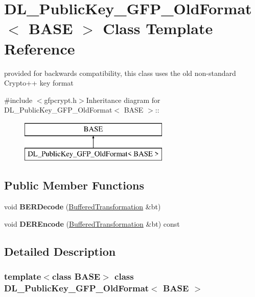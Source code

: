 \hypertarget{class_d_l___public_key___g_f_p___old_format}{
\section{DL\_\-PublicKey\_\-GFP\_\-OldFormat$<$ BASE $>$ Class Template Reference}
\label{class_d_l___public_key___g_f_p___old_format}
}


provided for backwards compatibility, this class uses the old non-\/standard Crypto++ key format  


{\ttfamily \#include $<$gfpcrypt.h$>$}Inheritance diagram for DL\_\-PublicKey\_\-GFP\_\-OldFormat$<$ BASE $>$::\begin{figure}[H]
\begin{center}
\leavevmode
\includegraphics[height=2cm]{class_d_l___public_key___g_f_p___old_format}
\end{center}
\end{figure}
\subsection*{Public Member Functions}
\begin{DoxyCompactItemize}
\item 
\hypertarget{class_d_l___public_key___g_f_p___old_format_a5c686ed241fe4eb62651fc3a02adf5ea}{
void {\bfseries BERDecode} (\hyperlink{class_buffered_transformation}{BufferedTransformation} \&bt)}
\label{class_d_l___public_key___g_f_p___old_format_a5c686ed241fe4eb62651fc3a02adf5ea}

\item 
\hypertarget{class_d_l___public_key___g_f_p___old_format_adcb4024350af6eb978de67a745366cf0}{
void {\bfseries DEREncode} (\hyperlink{class_buffered_transformation}{BufferedTransformation} \&bt) const }
\label{class_d_l___public_key___g_f_p___old_format_adcb4024350af6eb978de67a745366cf0}

\end{DoxyCompactItemize}


\subsection{Detailed Description}
\subsubsection*{template$<$class BASE$>$ class DL\_\-PublicKey\_\-GFP\_\-OldFormat$<$ BASE $>$}

